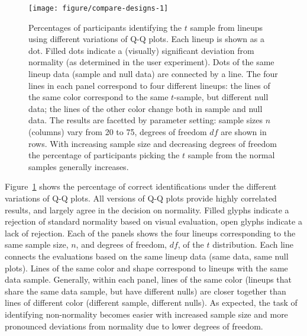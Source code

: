 \documentclass[12pt]{article}\usepackage[]{graphicx}\usepackage[]{color}
\newenvironment{knitrout}{}{} %
\begin{document}
\begin{figure}[ht]
\centering
\begin{knitrout}
\color{fgcolor}
\texttt{[image: figure/compare-designs-1]} 

\end{knitrout}
\caption{\label{fig:compare} Percentages of participants identifying the $t$ sample from lineups using different variations of Q-Q plots. Each lineup is shown as a dot. Filled dots indicate a (visually) significant deviation from normality (as determined in the user experiment). Dots of the same lineup data (sample and null data) are connected by a line.
The four lines in each panel correspond to four different lineups: the lines of the same color correspond to the same $t$-sample, but different null data; the lines of the other color change both in sample and null data. The results are facetted by parameter setting: sample sizes $n$ (columns) vary from 20 to 75, degrees of freedom $df$ are shown in rows. With increasing sample size and decreasing degrees of freedom the percentage of participants picking the $t$ sample  from the normal samples generally increases.
}
\end{figure}
\afterpage{\clearpage}

Figure~\ref{fig:compare} shows the percentage of correct identifications under the different variations of Q-Q plots. 
All versions of Q-Q plots provide highly correlated results, and largely agree in the decision on normality. Filled glyphs indicate a  rejection of standard normality based on visual evaluation, open glyphs indicate a lack of rejection. Each of the panels shows the four lineups corresponding to the same sample size, $n$, and degrees of freedom, $df$, of the $t$ distribution.
Each line connects the evaluations based on the same lineup data (same data, same null plots).
Lines of the same color and shape correspond to lineups with the same data sample. 
Generally, within each panel, lines of the same color  (lineups that share the same data sample, but have different nulls) are closer together than lines of different color (different sample, different nulls).  
As expected, the task of identifying non-normality becomes easier with increased sample size and more pronounced deviations from normality due to lower degrees of freedom. 
\end{document}
